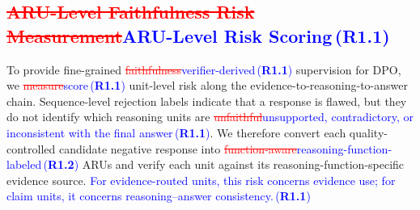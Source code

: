 \documentclass[a4paper,fleqn,doubleblind]{cas-sc}
\DeclareRobustCommand{\deleted}[1]{\textcolor{red}{\sout{#1}}}
\DeclareRobustCommand{\added}[1]{\textcolor{blue}{#1}}
\DeclareRobustCommand{\revtag}[1]{\textcolor{blue}{\scriptsize\,(\textbf{#1})}}
\begin{document}
\subsection{\deleted{ARU-Level Faithfulness Risk Measurement}\added{ARU-Level Risk Scoring}\revtag{R1.1}}
\label{sec:graph}
To provide fine-grained \deleted{faithfulness}\added{verifier-derived}\revtag{R1.1} supervision for DPO, we \deleted{measure}\added{score}\revtag{R1.1} unit-level risk along the evidence-to-reasoning-to-answer chain. Sequence-level rejection labels indicate that a response is flawed, but they do not identify which reasoning units are \deleted{unfaithful}\added{unsupported, contradictory, or inconsistent with the final answer}\revtag{R1.1}. We therefore convert each quality-controlled candidate negative response into \deleted{function-aware}\added{reasoning-function-labeled}\revtag{R1.2} ARUs and verify each unit against its reasoning-function-specific evidence source. \added{For evidence-routed units, this risk concerns evidence use; for claim units, it concerns reasoning--answer consistency.}\revtag{R1.1}
\end{document}
